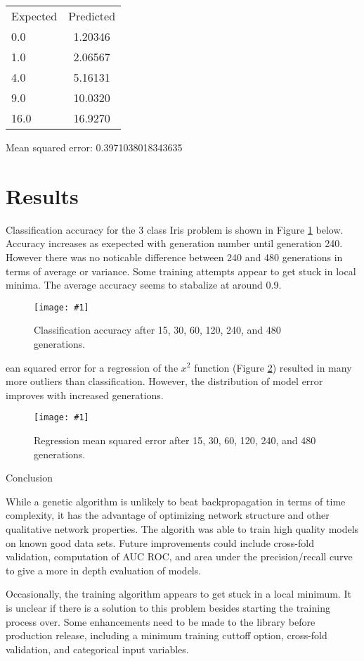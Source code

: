 \documentclass[twocolumn]{article}
\newcommand\fig[5]{
	\begin{figure}[H]
		\begin{center}\texttt{[image: \#1]}\end{center}
		\caption{#4}\label{fig:#2}
	\end{figure}
}
\newcommand\figRef[1]{Figure \ref{fig:#1}\xspace}
\begin{document}
\begin{center}
\begin{tabular}{ l c }
Expected & Predicted \\
0.0 & 1.20346 \\
1.0 & 2.06567 \\
4.0 & 5.16131 \\
9.0 & 10.0320 \\
16.0 & 16.9270
\end{tabular}
\end{center}

Mean squared error: 0.3971038018343635

\section{Results}

Classification accuracy for the 3 class Iris problem is shown in \figRef{classificationBenchmark} below. Accuracy increases as exepected with generation number until generation 240. However there was no noticable difference between 240 and 480 generations in terms of average or variance. Some training attempts appear to get stuck in local minima. The average accuracy seems to stabalize at around 0.9.

\fig{images/AccuracyByGeneration.png}{classificationBenchmark}{0.45}{
Classification accuracy after 15, 30, 60, 120, 240, and 480 generations.
}

Mean squared error for a regression of the $x^2$ function (\figRef{regressionBenchmark}) resulted in many more outliers than classification. However, the distribution of model error improves with increased generations.

\fig{images/ErrorByGeneration.png}{regressionBenchmark}{0.45}{
Regression mean squared error after 15, 30, 60, 120, 240, and 480 generations.
}

\section{Conclusion}

While a genetic algorithm is unlikely to beat backpropagation in terms of time complexity, it has the advantage of optimizing network structure and other qualitative network properties. The algorith was able to train high quality models on known good data sets. Future improvements could include cross-fold validation, computation of AUC ROC, and area under the precision/recall curve to give a more in depth evaluation of models. 

Occasionally, the training algorithm appears to get stuck in a local minimum. It is unclear if there is a solution to this problem besides starting the training process over. Some enhancements need to be made to the library before production release, including a minimum training cuttoff option, cross-fold validation, and categorical input variables. 

\printbibliography
\end{document}
